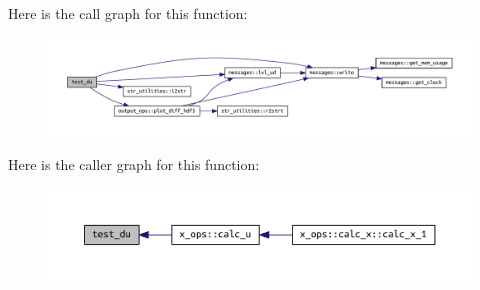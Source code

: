 Here is the call graph for this function\+:\nopagebreak
\begin{figure}[H]
\begin{center}
\leavevmode
\includegraphics[width=350pt]{X__ops_8f90_a60ad682c469a085ff3f744ce3191940f_cgraph}
\end{center}
\end{figure}
Here is the caller graph for this function\+:\nopagebreak
\begin{figure}[H]
\begin{center}
\leavevmode
\includegraphics[width=350pt]{X__ops_8f90_a60ad682c469a085ff3f744ce3191940f_icgraph}
\end{center}
\end{figure}
